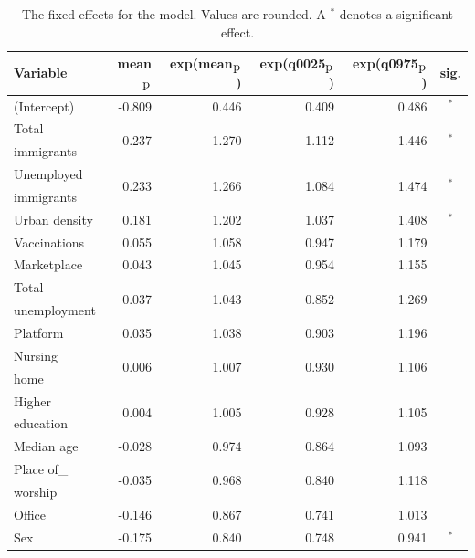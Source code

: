 \begin{table}[H]
\caption{The fixed effects for the model. Values are rounded. A $^*$ denotes a significant effect. \label{fixedAllNorway_nospatial}}
\begin{tabular}{l r r r r c}
\toprule
\textbf{Variable}	& \textbf{mean$_{\hbox{p}}$}	& \textbf{exp(mean$_{\hbox{p}}$)} & \textbf{exp(q0025$_{\hbox{p}}$)} & \textbf{exp(q0975$_{\hbox{p}}$)} & \textbf{sig.}\\
\midrule
(Intercept) & -0.809 & 0.446 & 0.409 & 0.486 & $^*$ \\
Total & \multirow{2}{*}{0.237}& \multirow{2}{*}{1.270}& \multirow{2}{*}{1.112}& \multirow{2}{*}{1.446}& \multirow{2}{*}{$^*$}\\
immigrants \\
Unemployed & \multirow{2}{*}{0.233} & \multirow{2}{*}{1.266} & \multirow{2}{*}{1.084} & \multirow{2}{*}{1.474} & \multirow{2}{*}{$^*$} \\
immigrants\\
Urban density & 0.181 & 1.202 & 1.037 & 1.408 & $^*$ \\
Vaccinations & 0.055 & 1.058 & 0.947 & 1.179\\
Marketplace & 0.043 & 1.045 & 0.954 & 1.155 \\
Total & \multirow{2}{*}{0.037} & \multirow{2}{*}{1.043} & \multirow{2}{*}{0.852} & \multirow{2}{*}{1.269} \\
unemployment \\
Platform & 0.035 & 1.038 & 0.903 & 1.196 \\
Nursing & \multirow{2}{*}{0.006} & \multirow{2}{*}{1.007} & \multirow{2}{*}{0.930} & \multirow{2}{*}{1.106} \\
home\\
Higher & \multirow{2}{*}{0.004}& \multirow{2}{*}{1.005}& \multirow{2}{*}{0.928}& \multirow{2}{*}{1.105}\\ 
education \\
Median age & -0.028 & 0.974 & 0.864 & 1.093 \\
Place of\_ & \multirow{2}{*}{-0.035}& \multirow{2}{*}{0.968}& \multirow{2}{*}{0.840}& \multirow{2}{*}{1.118} \\
worship \\
Office & -0.146 & 0.867 & 0.741 & 1.013 \\
Sex & -0.175 & 0.840 & 0.748 & 0.941 & $^*$ \\
\bottomrule
\end{tabular}
\end{table}
\clearpage
